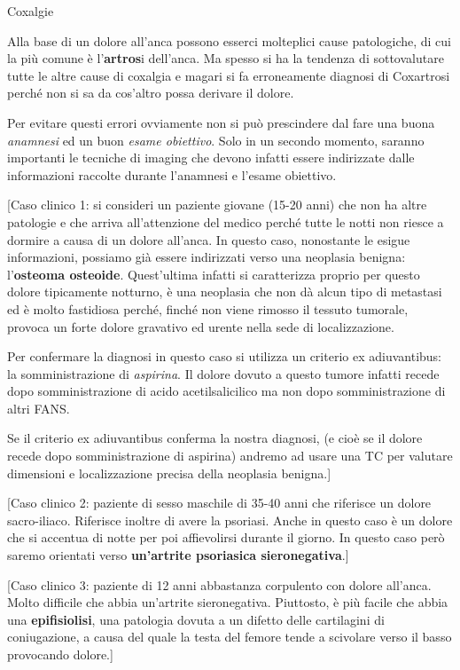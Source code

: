 \documentclass[]{article}
\date{}
\begin{document}
Coxalgie

Alla base di un dolore all'anca possono esserci molteplici cause
patologiche, di cui la più comune è l'\textbf{artros}i dell'anca. Ma
spesso si ha la tendenza di sottovalutare tutte le altre cause di
coxalgia e magari si fa erroneamente diagnosi di Coxartrosi perché non
si sa da cos'altro possa derivare il dolore.

Per evitare questi errori ovviamente non si può prescindere dal fare una
buona \emph{anamnesi} ed un buon \emph{esame obiettivo}. Solo in un
secondo momento, saranno importanti le tecniche di imaging che devono
infatti essere indirizzate dalle informazioni raccolte durante
l'anamnesi e l'esame obiettivo.

{[}Caso clinico 1: si consideri un paziente giovane (15-20 anni) che non
ha altre patologie e che arriva all'attenzione del medico perché tutte
le notti non riesce a dormire a causa di un dolore all'anca. In questo
caso, nonostante le esigue informazioni, possiamo già essere indirizzati
verso una neoplasia benigna: l'\textbf{osteoma osteoide}. Quest'ultima
infatti si caratterizza proprio per questo dolore tipicamente notturno,
è una neoplasia che non dà alcun tipo di metastasi ed è molto fastidiosa
perché, finché non viene rimosso il tessuto tumorale, provoca un forte
dolore gravativo ed urente nella sede di localizzazione.

Per confermare la diagnosi in questo caso si utilizza un criterio ex
adiuvantibus: la somministrazione di \emph{aspirina}. Il dolore dovuto a
questo tumore infatti recede dopo somministrazione di acido
acetilsalicilico ma non dopo somministrazione di altri FANS.

Se il criterio ex adiuvantibus conferma la nostra diagnosi, (e cioè se
il dolore recede dopo somministrazione di aspirina) andremo ad usare una
TC per valutare dimensioni e localizzazione precisa della neoplasia
benigna.{]}

{[}Caso clinico 2: paziente di sesso maschile di 35-40 anni che
riferisce un dolore sacro-iliaco. Riferisce inoltre di avere la
psoriasi. Anche in questo caso è un dolore che si accentua di notte per
poi affievolirsi durante il giorno. In questo caso però saremo orientati
verso \textbf{un'artrite psoriasica sieronegativa}.{]}

{[}Caso clinico 3: paziente di 12 anni abbastanza corpulento con dolore
all'anca. Molto difficile che abbia un'artrite sieronegativa. Piuttosto,
è più facile che abbia una \textbf{epifisiolisi}, una patologia dovuta a
un difetto delle cartilagini di coniugazione, a causa del quale la testa
del femore tende a scivolare verso il basso provocando dolore.{]}
\end{document}

